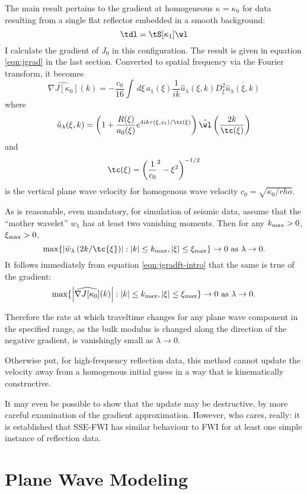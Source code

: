 The main result pertains to the gradient at homogeneous
$\kappa=\kappa_0$ for data resulting from a single flat reflector
embedded in a smooth background:
\[
\tdl = \tS[\kappa_1]\wl
\]
I calculate the gradient of $J_0$ in this configuration.
The result is given in equation \ref{eqn:jgrad} in the last
section. Converted to spatial frequency via the Fourier transform, it
becomes
\begin{equation}
\label{eqn:jgradft-intro}
\widehat{\nabla J[\kappa_0]}(k) = -\frac{c_0}{16}\int\, d\xi\,a_1(\xi) 
\frac{1}{ik}\hat{u}_{\lambda}(\xi,k)D_{\xi}^2\overline{\hat{u}_{\lambda}(\xi,k)}
\end{equation}
where
\[
\hat{u}_{\lambda}(\xi,k) = \left(1 +
  \frac{R(\xi)}{a_0(\xi)}e^{4ik\tau(\xi,z_1)/\tc(\xi)}\right)\hat{\wl}\left(\frac{2k}{\tc(\xi)}\right) 
\]
and 
\[
\tc(\xi) = \left(\frac{1}{c_0}^2-\xi^2\right)^{-1/2}
\]
is the vertical plane wave velocity for homogenous wave velocity
$c_0 = \sqrt{\kappa_0/rho}$.

As is reasonable, even mandatory, for simulation of seismic data,
assume that the ``mother wavelet'' $w_1$ has at least two vanishing
moments. Then for any $k_{\rm max} >0$, $\xi_{\rm max} > 0$,
\[
\max \{\left|\hat{w}_{\lambda}\left(2k/\tc{\xi}\right)\right|:
|k|\le k_{\rm max}, |\xi|\le \xi_{\rm max} \} \rightarrow 0\mbox{ as }
\lambda \rightarrow 0.
\]
It follows immediately from equation \ref{eqn:jgradft-intro} that the
same is true of the gradient:
\begin{equation}
\label{eqn:bigdeal}
\max \{\left|\widehat{\nabla J[\kappa_0]}(k)\right|:
|k|\le k_{\rm max}, |\xi|\le \xi_{\rm max} \} \rightarrow 0\mbox{ as }
\lambda \rightarrow 0.
\end{equation}

Therefore the rate at which traveltime changes for any plane wave
component in the specified range, as the bulk modulus is changed along
the direction of the negative gradient, is vanishingly small as
$\lambda \rightarrow 0$. 

Otherwise put, for high-frequency reflection data, this method cannot
update the velocity away from a homogenous initial guess in a way that
is kinematically constructive.

It may even be possible to show that the update may be destructive, by
more careful examination of the gradient approximation. However, who
cares, really: it is established that SSE-FWI has similar behaviour to
FWI for at least one simple instance of reflection data.

\section{Plane Wave Modeling}

